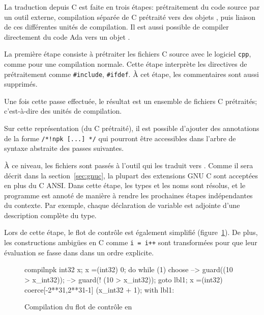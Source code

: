 La traduction depuis C est faite en trois étapes: prétraitement du code source
par un outil externe, compilation séparée de C prétraité vers des objets
\newspeak{}, puis liaison de ces différentes unités de compilation. Il est aussi
possible de compiler directement du code Ada vers un objet \newspeak{}.

La première étape consiste à prétraiter les fichiers C source avec le logiciel
\texttt{cpp}, comme pour une compilation normale. Cette étape interprète les
directives de prétraitement comme \texttt{\#include}, \texttt{\#ifdef}. À cet
étape, les commentaires sont aussi supprimés.

Une fois cette passe effectuée, le résultat est un ensemble de fichiers C
prétraités; c'est-à-dire des unités de compilation.

Sur cette représentation (du C prétraité), il est possible d'ajouter des
annotations de la forme \texttt{/*!npk [...] */} qui pourront être accessibles
dans l'arbre de syntaxe abstraite des passes suivantes.

À ce niveau, les fichiers sont passés à l'outil \ctonewspeak qui les
traduit vers \newspeak. Comme il sera décrit dans la section~\ref{sec:gnuc}, la
plupart des extensions GNU C sont acceptées en plus du C ANSI. Dans cette étape,
les types et les noms sont résolus, et le programme est annoté de manière à
rendre les prochaines étapes indépendantes du contexte. Par exemple, chaque
déclaration de variable est adjointe d'une description complète du type.

Lors de cette étape, le flot de contrôle est également simplifié
(figure~\ref{fig:flot-controle-simple}). De plus, les constructions ambigües en
C comme \texttt{i = i++} sont transformées pour que leur évaluation se fasse
dans dans un ordre explicite.

\begin{figure}[b]

\begin{SaveVerbatim}{compilnpk}
int32 x;
x =(int32) 0;
do {
    while (1) {
        choose {
            -->
                guard((10 > x_int32));
            -->
                guard(! (10 > x_int32));
                goto lbl1;
        }
        x =(int32) coerce[-2**31,2**31-1] (x_int32 + 1);
    }
} with lbl1: {
}
\end{SaveVerbatim}

\vrule\hspace{2pt}

    \caption{Compilation du flot de contrôle en \newspeak}
    \label{fig:flot-controle-simple}
\end{figure}

